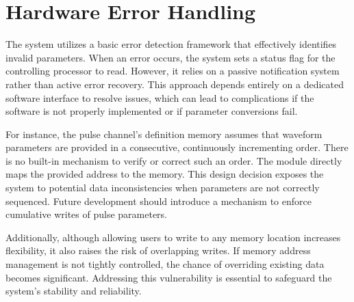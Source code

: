 \section{Hardware Error Handling}

The system utilizes a basic error detection framework that effectively identifies invalid parameters. When an error occurs, the system sets a status flag for the controlling processor to read. However, it relies on a passive notification system rather than active error recovery. This approach depends entirely on a dedicated software interface to resolve issues, which can lead to complications if the software is not properly implemented or if parameter conversions fail.

For instance, the pulse channel's definition memory assumes that waveform parameters are provided in a consecutive, continuously incrementing order. There is no built-in mechanism to verify or correct such an order. The module directly maps the provided address to the memory. This design decision exposes the system to potential data inconsistencies when parameters are not correctly sequenced. Future development should introduce a mechanism to enforce cumulative writes of pulse parameters. 

Additionally, although allowing users to write to any memory location increases flexibility, it also raises the risk of overlapping writes. If memory address management is not tightly controlled, the chance of overriding existing data becomes significant. Addressing this vulnerability is essential to safeguard the system's stability and reliability.